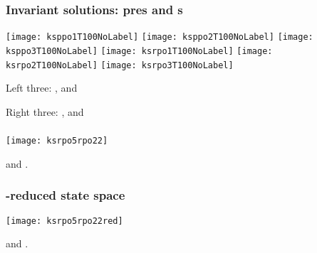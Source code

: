 \begin{frame}[shrink]%
  \frametitle{\small Invariant solutions: pre\po s and \rpo s}
  \putsym


    \begin{center}
    \texttt{[image: ksppo1T100NoLabel]}
    \texttt{[image: ksppo2T100NoLabel]}
    \texttt{[image: ksppo3T100NoLabel]}
    \texttt{[image: ksrpo1T100NoLabel]}
    \texttt{[image: ksrpo2T100NoLabel]}
    \texttt{[image: ksrpo3T100NoLabel]}

    {
      Left three: ,  and 

      Right three: ,  and 
    }
    \end{center}
\end{frame}

\begin{frame}[shrink]%
  \frametitle{\Statesp}
  \putsym

  \begin{center}
    \texttt{[image: ksrpo5rpo22]}

    {
       and .
    }
  \end{center}

\end{frame}

\begin{frame}[shrink]%
  \frametitle{-reduced state space}
  \putsym

  \begin{center}
    \texttt{[image: ksrpo5rpo22red]}

{
       and .
    }
  \end{center}

\end{frame}
